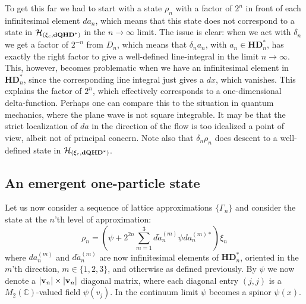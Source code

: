 \documentclass[12pt]{article}
\def\d{\delta}
\def\G{\Gamma}
\def\ch{{\cal H}}
\begin{document}
To get this far we had to start with a state $\rho_n$ with a factor of $2^n$ in front of each infinitesimal element $da_n$, which means that this state does not correspond to a state in $\ch_{(\xi_c,\mathbf{dQHD}^*)}$ in the $n\rightarrow\infty$ limit. The issue is clear: when we act with $\d_n$ we get a factor of $2^{-n}$ from $D_n$, which means that $\d_n a_n$, with $a_n\in\mathbf{HD}^*_n$, has exactly the right factor to give a well-defined line-integral in the limit $n\rightarrow\infty$. This, however, becomes problematic when we have an infinitesimal element in $\mathbf{HD}^*_n$, since the corresponding line integral just gives a $dx$, which vanishes. This explains the factor of $2^n$, which effectively corresponds to a one-dimensional delta-function. Perhaps one can compare this to the situation in quantum mechanics, where the plane wave is not square integrable. It may be that the strict localization of $da$ in the direction of the flow is too idealized a point of view, albeit not of principal concern. 
Note also that $\d_n\rho_n$ does descent to a well-defined state in $\ch_{(\xi_c,\mathbf{dQHD}^*)}$.  










\subsection{An emergent one-particle state}


Let us now consider a sequence of lattice approximations $\{\G_n\}$ and consider the state at the $n$'th level of approximation:
\begin{equation}
\rho_n = (\psi  +2^{2n}\sum_{m=1}^3  d\tilde{a}_n^{(m)} \psi da_n^{(m)*} )\xi_n %
\label{one-state}
\end{equation}
where $da_n^{(m)}$ and $d\tilde{a}_n^{(m)}$ are now infinitesimal elements of $\mathbf{HD}^*_n$, oriented in the $m$'th direction, $m\in\{1,2,3\}$, and otherwise as defined previously. By $\psi$ we now denote a $\vert {\bf v}_n\vert \times \vert {\bf v}_n\vert$ diagonal matrix, where each diagonal entry $(j,j)$ is a $M_2(\mathbb{C})$-valued field $\psi(v_j)$. In the continuum limit $\psi$ becomes a spinor $\psi(x)$.
\end{document}
